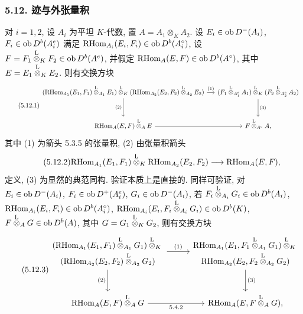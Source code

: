 \subsubsection*{5.12. 迹与外张量积}

对 $i=1,2$, 设 $A_i$ 为平坦 $K$-代数, 置 $A=A_1\otimes_KA_2$. 设 $E_i\in\operatorname{ob} D^-(A_i)$, $F_i\in\operatorname{ob} D^b(A_i^e)$ 满足 $\mathrm{RHom}_{A_i}(E_i,F_i)\in\operatorname{ob} D^b(A_i^\circ)$, 设 $F=F_1\overset{\mathrm L}{\otimes}_KF_2\in\operatorname{ob} D^b(A^e)$, 并假定 $\mathrm{RHom}_A(E,F)\in\operatorname{ob} D^b(A^\circ)$, 其中 $E=E_1\overset{\mathrm L}{\otimes}_KE_2$. 则有交换方块
\begin{equation}\tag{5.12.1}
\begin{tikzcd}[column sep=small,row sep=large]
(\RHom_{A_1}(E_1,F_1)\lten_{A_1}E_1)\lten_K(\RHom_{A_2}(E_2,F_2)\lten_{A_2}E_2) \arrow[r,"(1)"] \arrow[d,"(2)"'] & (F_1\lten_{A_1^e}A_1)\lten_K(F_2\lten_{A_2^e}A_2) \arrow[d,"(3)"]\\
\RHom_A(E,F)\lten_AE \arrow[r] & F\lten_{A^e}A,
\end{tikzcd}
\end{equation}
其中 (1) 为箭头 5.3.5 的张量积, (2) 由张量积箭头
\begin{equation}\tag{5.12.2}
\mathrm{RHom}_{A_1}(E_1,F_1)\overset{\mathrm L}{\otimes}_K\mathrm{RHom}_{A_2}(E_2,F_2)\longrightarrow\mathrm{RHom}_A(E,F),
\end{equation}
定义, (3) 为显然的典范同构. 验证本质上是直接的. 同样可验证, 对 $E_i\in\allowbreak \operatorname{ob} D^-(A_i)$, $F_i\in\allowbreak \operatorname{ob} D^+(A_i^e)$, $G_i\in\allowbreak \operatorname{ob} D^-(A_i)$, 若 $F_i\overset{\mathrm L}{\otimes}_{A_i}G_i\in\allowbreak \operatorname{ob} D^b(A_i)$, $\mathrm{RHom}_{A_i}(E_i,F_i)\in\allowbreak \operatorname{ob} D^b(A_i^\circ)$, $\mathrm{RHom}_{A_i}(E_i,F_i\overset{\mathrm L}{\otimes}_{A_i}G_i)\in\allowbreak \operatorname{ob} D^b(K)$, $F\overset{\mathrm L}{\otimes}_AG\in\allowbreak \operatorname{ob} D^b(A)$, 其中 $G=\allowbreak G_1\overset{\mathrm L}{\otimes}_KG_2$, 则有交换方块
\begin{equation}\tag{5.12.3}
{
\begin{tikzcd}[column sep=2.8em,row sep=large]
\begin{gathered}
(\RHom_{A_1}(E_1,F_1)\lten_{A_1}G_1)\lten_K{}\\[-.15em]
(\RHom_{A_2}(E_2,F_2)\lten_{A_2}G_2)
\end{gathered}
\arrow[r,"(1)"] \arrow[d,"(2)"']
&
\begin{gathered}
\RHom_{A_1}(E_1,F_1\lten_{A_1}G_1)\lten_K{}\\[-.15em]
\RHom_{A_2}(E_2,F_2\lten_{A_2}G_2)
\end{gathered}
\arrow[d,"(3)"]\\
\RHom_A(E,F)\lten_AG \arrow[r,"5.4.2"'] & \RHom_A(E,F\lten_AG),
\end{tikzcd}
}
\end{equation}
